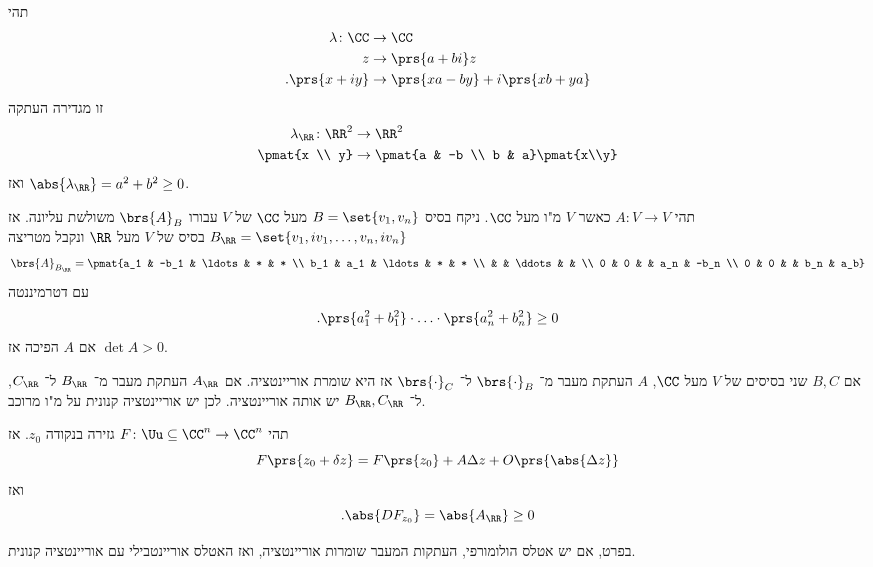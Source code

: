 \documentclass[a4paper,10pt,twoside,openany]{book}
\begin{document}
\begin{example}
תהי
\begin{align*}
\lambda \colon \CC &\to \CC \\
z &\to \prs{a+bi}z \\
\text{.} \prs{x+iy} &\to \prs{xa - by} + i\prs{xb + ya}
\end{align*}
זו מגדירה העתקה
\begin{align*}
\lambda_{\RR} \colon \RR^2 &\to \RR^2 \\
\pmat{x \\ y} &\to \pmat{a & -b \\ b & a}\pmat{x\\y}
\end{align*}
ואז
$\abs{\lambda_{\RR}} = a^2 + b^2 \geq 0$.

תהי
$A \colon V \to V$
כאשר
$V$
מ"ו מעל
$\CC$.
ניקח בסיס
$B=\set{v_1, v_n}$
מעל
$\CC$
של
$V$
עבורו
$\brs{A}_B$
משולשת עליונה.
אז
$B_{\RR} = \set{v_1, iv_1, \ldots, v_n, iv_n}$
בסיס של
$V$
מעל
$\RR$
ונקבל מטריצה
\[\brs{A}_{B_{\RR}} = \pmat{a_1 & -b_1 &  \ldots & * & * \\ b_1 & a_1 &  \ldots & * & * \\ & & \ddots & & \\ 0 & 0 & & a_n & -b_n \\ 0 & 0 & & b_n & a_b}\]
עם דטרמיננטה
\[\text{.} \prs{a_1^2 + b_1^2} \cdot \ldots \cdot \prs{a_n^2 + b_n^2} \geq 0\]
אם
$A$
הפיכה אז
$\det A > 0$.
\end{example}

\begin{corollary}
אם
$B,C$
שני בסיסים של
$V$
מעל
$\CC$,
$A$
העתקת מעבר מ־%
$\brs{\cdot}_B$
ל־%
$\brs{\cdot}_C$
אז היא שומרת אוריינטציה.
אם
$A_{\RR}$
העתקת מעבר מ־%
$B_{\RR}$
ל־%
$C_{\RR}$,
ל־%
$B_{\RR},C_{\RR}$
יש אותה אוריינטציה.
לכן יש אוריינטציה קנונית על מ"ו מרוכב.
\end{corollary}

\begin{example}
תהי
$F \colon \Uu \subseteq \CC^n \to \CC^n$
גזירה בנקודה
$z_0$.
אז
\[F\prs{z_0 + \delta z} = F\prs{z_0} + A\Delta z + O\prs{\abs{\Delta z}}\]
ואז
\[\text{.} \abs{DF_{z_0}} = \abs{A_{\RR}} \geq 0\]

בפרט, אם יש אטלס הולומורפי, העתקות המעבר שומרות אוריינטציה, ואז האטלס אוריינטבילי עם אוריינטציה קנונית.
\end{example}
\end{document}
